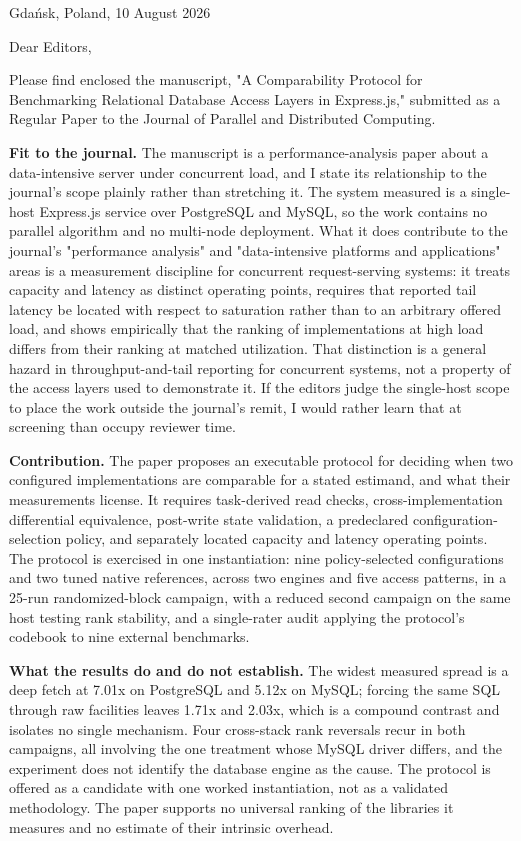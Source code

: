 \documentclass[11pt,a4paper]{article}
\begin{document}
Gdańsk, Poland, 10 August 2026

Dear Editors,

Please find enclosed the manuscript, "A Comparability Protocol for Benchmarking Relational Database Access Layers in Express.js," submitted as a Regular Paper to the Journal of Parallel and Distributed Computing.

\textbf{Fit to the journal.} The manuscript is a performance-analysis paper about a data-intensive server under concurrent load, and I state its relationship to the journal's scope plainly rather than stretching it. The system measured is a single-host Express.js service over PostgreSQL and MySQL, so the work contains no parallel algorithm and no multi-node deployment. What it does contribute to the journal's "performance analysis" and "data-intensive platforms and applications" areas is a measurement discipline for concurrent request-serving systems: it treats capacity and latency as distinct operating points, requires that reported tail latency be located with respect to saturation rather than to an arbitrary offered load, and shows empirically that the ranking of implementations at high load differs from their ranking at matched utilization. That distinction is a general hazard in throughput-and-tail reporting for concurrent systems, not a property of the access layers used to demonstrate it. If the editors judge the single-host scope to place the work outside the journal's remit, I would rather learn that at screening than occupy reviewer time.

\textbf{Contribution.} The paper proposes an executable protocol for deciding when two configured implementations are comparable for a stated estimand, and what their measurements license. It requires task-derived read checks, cross-implementation differential equivalence, post-write state validation, a predeclared configuration-selection policy, and separately located capacity and latency operating points. The protocol is exercised in one instantiation: nine policy-selected configurations and two tuned native references, across two engines and five access patterns, in a 25-run randomized-block campaign, with a reduced second campaign on the same host testing rank stability, and a single-rater audit applying the protocol's codebook to nine external benchmarks.

\textbf{What the results do and do not establish.} The widest measured spread is a deep fetch at 7.01x on PostgreSQL and 5.12x on MySQL; forcing the same SQL through raw facilities leaves 1.71x and 2.03x, which is a compound contrast and isolates no single mechanism. Four cross-stack rank reversals recur in both campaigns, all involving the one treatment whose MySQL driver differs, and the experiment does not identify the database engine as the cause. The protocol is offered as a candidate with one worked instantiation, not as a validated methodology. The paper supports no universal ranking of the libraries it measures and no estimate of their intrinsic overhead.
\end{document}
